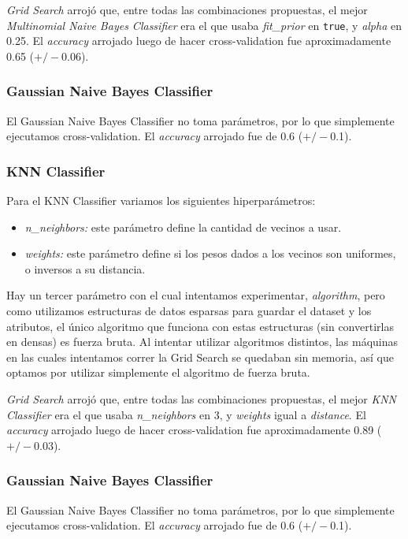 \documentclass[a4paper]{article}
\begin{document}
\textit{Grid Search} arrojó que, entre todas las combinaciones propuestas, el mejor \textit{Multinomial Naive Bayes Classifier} era el que usaba \textit{fit\_prior} en \texttt{true}, y \textit{alpha} en 0.25. \newline
\indent El \textit{accuracy} arrojado luego de hacer cross-validation fue aproximadamente 0.65 ($+/-$0.06).

\subsubsection{Gaussian Naive Bayes Classifier}
El Gaussian Naive Bayes Classifier no toma parámetros, por lo que simplemente ejecutamos cross-validation. El \textit{accuracy} arrojado fue de 0.6 ($+/-$0.1).

\subsubsection{KNN Classifier}
Para el KNN Classifier variamos los siguientes hiperparámetros:
\begin{itemize}
	\item \textit{n_neighbors:} este parámetro define la cantidad de vecinos a usar.
	\item \textit{weights:} este parámetro define si los pesos dados a los vecinos son uniformes, o inversos a su distancia.
\end{itemize}

Hay un tercer parámetro con el cual intentamos experimentar, \textit{algorithm}, pero como utilizamos estructuras de datos esparsas para guardar el dataset y los atributos, el único algoritmo que funciona con estas estructuras (sin convertirlas en densas) es fuerza bruta. Al intentar utilizar algoritmos distintos, las máquinas en las cuales intentamos correr la Grid Search se quedaban sin memoria, así que optamos por utilizar simplemente el algoritmo de fuerza bruta.

\textit{Grid Search} arrojó que, entre todas las combinaciones propuestas, el mejor \textit{KNN Classifier} era el que usaba \textit{n\_neighbors} en 3, y \textit{weights} igual a \textit{distance}. \newline
\indent El \textit{accuracy} arrojado luego de hacer cross-validation fue aproximadamente 0.89 ($+/-$0.03).

\subsubsection{Gaussian Naive Bayes Classifier}
El Gaussian Naive Bayes Classifier no toma parámetros, por lo que simplemente ejecutamos cross-validation. El \textit{accuracy} arrojado fue de 0.6 ($+/-$0.1).
\end{document}
